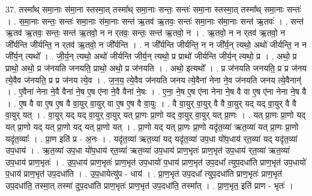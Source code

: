 \documentclass[17pt]{extarticle}
\begin{document}
37. तस्मा᳚थ् समा॒नाः स॑मा॒ना स्तस्मा॒त् तस्मा᳚थ् समा॒नाः सन्तः॒ सन्तः॑ समा॒ना स्तस्मा॒त् तस्मा᳚थ् समा॒नाः सन्तः॑ । . स॒मा॒नाः सन्तः॒ सन्तः॑ समा॒नाः स॑मा॒नाः सन्त॑ ऋ॒तव॑ ऋ॒तवः॒ सन्तः॑ समा॒नाः स॑मा॒नाः सन्त॑ ऋ॒तवः॑ । . सन्त॑ ऋ॒तव॑ ऋ॒तवः॒ सन्तः॒ सन्त॑ ऋ॒तवो॒ न न र्‌तवः॒ सन्तः॒ सन्त॑ ऋ॒तवो॒ न । . ऋ॒तवो॒ न न र्‌तव॑ ऋ॒तवो॒ न जी᳚र्यन्ति जीर्यन्ति॒ न र्‌तव॑ ऋ॒तवो॒ न जी᳚र्यन्ति । . न जी᳚र्यन्ति जीर्यन्ति॒ न न जी᳚र्य॒न् त्यथो॒ अथो॑ जीर्यन्ति॒ न न जी᳚र्य॒न् त्यथो᳚ । . जी॒र्य॒न् त्यथो॒ अथो॑ जीर्यन्ति जीर्य॒न् त्यथो॒ प्र प्राथो॑ जीर्यन्ति जीर्य॒न् त्यथो॒ प्र । . अथो॒ प्र प्राथो॒ अथो॒ प्र ज॑नयति जनयति॒ प्राथो॒ अथो॒ प्र ज॑नयति । . अथो॒ इत्यथो᳚ । . प्र ज॑नयति जनयति॒ प्र प्र ज॑नय त्ये॒वैव ज॑नयति॒ प्र प्र ज॑नय त्ये॒व । . ज॒न॒य॒ त्ये॒वैव ज॑नयति जनय त्ये॒वैना॑ नेना ने॒व ज॑नयति जनय त्ये॒वैनान्॑ । . ए॒वैना॑ नेना ने॒वै वैना॑ ने॒ष ए॒ष ए॑ना ने॒वै वैना॑ ने॒षः । . ए॒ना॒ ने॒ष ए॒ष ए॑ना नेना ने॒ष वै वा ए॒ष ए॑ना नेना ने॒ष वै । . ए॒ष वै वा ए॒ष ए॒ष वै वा॒युर् वा॒युर् वा ए॒ष ए॒ष वै वा॒युः । . वै वा॒युर् वा॒युर् वै वै वा॒युर् यद् यद् वा॒युर् वै वै वा॒युर् यत् । . वा॒युर् यद् यद् वा॒युर् वा॒युर् यत् प्रा॒णः प्रा॒णो यद् वा॒युर् वा॒युर् यत् प्रा॒णः । . यत् प्रा॒णः प्रा॒णो यद् यत् प्रा॒णो यद् यत् प्रा॒णो यद् यत् प्रा॒णो यत् । . प्रा॒णो यद् यत् प्रा॒णः प्रा॒णो यदृ॑त॒व्या॑ ऋत॒व्या॑ यत् प्रा॒णः प्रा॒णो यदृ॑त॒व्याः᳚ । . प्रा॒ण इति॑ प्र - अ॒नः । . यदृ॑त॒व्या॑ ऋत॒व्या॑ यद् यदृ॑त॒व्या॑ उप॒धा यो॑प॒धाय॑ र्‌त॒व्या॑ यद् यदृ॑त॒व्या॑ उप॒धाय॑ । . ऋ॒त॒व्या॑ उप॒धा यो॑प॒धाय॑ र्‌त॒व्या॑ ऋत॒व्या॑ उप॒धाय॑ प्राण॒भृतः॑ प्राण॒भृत॑ उप॒धाय॑ र्‌त॒व्या॑ ऋत॒व्या॑ उप॒धाय॑ प्राण॒भृतः॑ । . उ॒प॒धाय॑ प्राण॒भृतः॑ प्राण॒भृत॑ उप॒धायो॑ प॒धाय॑ प्राण॒भृत॑ उप॒दधा᳚ त्युप॒दधा॑ति प्राण॒भृत॑ उप॒धायो॑ प॒धाय॑ प्राण॒भृत॑ उप॒दधा॑ति । . उ॒प॒धायेत्यु॑प - धाय॑ । . प्रा॒ण॒भृत॑ उप॒दधा᳚ त्युप॒दधा॑ति प्राण॒भृतः॑ प्राण॒भृत॑ उप॒दधा॑ति॒ तस्मा॒त् तस्मा॑ दुप॒दधा॑ति प्राण॒भृतः॑ प्राण॒भृत॑ उप॒दधा॑ति॒ तस्मा᳚त् । . प्रा॒ण॒भृत॒ इति॑ प्राण - भृतः॑ । \newline
\pagebreak
{}
\end{document}
